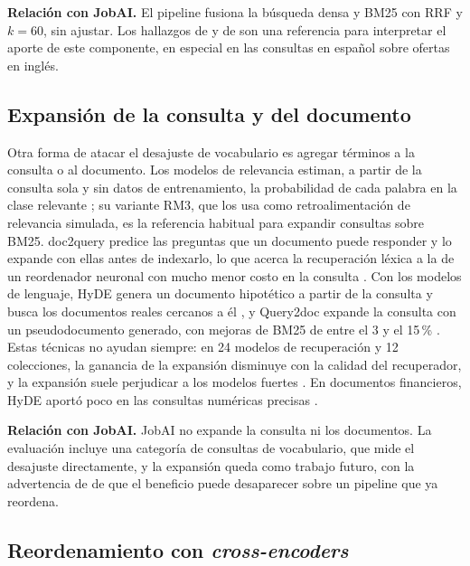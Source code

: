 \textbf{Relación con JobAI.} El pipeline fusiona la búsqueda densa y BM25 con RRF y $k = 60$, sin ajustar. Los hallazgos de \citet{Bruch2023} y de \citet{Thuma2026} son una referencia para interpretar el aporte de este componente, en especial en las consultas en español sobre ofertas en inglés.

\subsection{Expansión de la consulta y del documento}

Otra forma de atacar el desajuste de vocabulario es agregar términos a la consulta o al documento. Los modelos de relevancia estiman, a partir de la consulta sola y sin datos de entrenamiento, la probabilidad de cada palabra en la clase relevante \citep{LavrenkoCroft2001}; su variante RM3, que los usa como retroalimentación de relevancia simulada, es la referencia habitual para expandir consultas sobre BM25. doc2query predice las preguntas que un documento puede responder y lo expande con ellas antes de indexarlo, lo que acerca la recuperación léxica a la de un reordenador neuronal con mucho menor costo en la consulta \citep{Nogueira2019Doc2query}. Con los modelos de lenguaje, HyDE genera un documento hipotético a partir de la consulta y busca los documentos reales cercanos a él \citep{Gao2023HyDE}, y Query2doc expande la consulta con un pseudodocumento generado, con mejoras de BM25 de entre el 3 y el 15\,\% \citep{Wang2023Query2doc}. Estas técnicas no ayudan siempre: en 24 modelos de recuperación y 12 colecciones, la ganancia de la expansión disminuye con la calidad del recuperador, y la expansión suele perjudicar a los modelos fuertes \citep{Weller2024}. En documentos financieros, HyDE aportó poco en las consultas numéricas precisas \citep{Akarsu2026}.

\textbf{Relación con JobAI.} JobAI no expande la consulta ni los documentos. La evaluación incluye una categoría de consultas de vocabulario, que mide el desajuste directamente, y la expansión queda como trabajo futuro, con la advertencia de \citet{Weller2024} de que el beneficio puede desaparecer sobre un pipeline que ya reordena.

\subsection{Reordenamiento con \textit{cross-encoders}}

